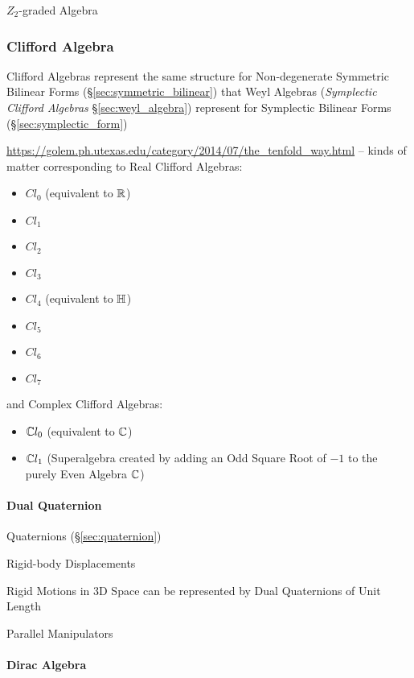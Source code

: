 {{$Z_2$-graded Algebra



\subsubsection{Clifford Algebra}\label{sec:clifford_algebra}

Clifford Algebras represent the same structure for Non-degenerate Symmetric
Bilinear Forms (\S\ref{sec:symmetric_bilinear}) that Weyl Algebras
(\emph{Symplectic Clifford Algebras} \S\ref{sec:weyl_algebra}) represent for
Symplectic Bilinear Forms (\S\ref{sec:symplectic_form})

\url{https://golem.ph.utexas.edu/category/2014/07/the_tenfold_way.html} -- kinds
of matter corresponding to Real Clifford Algebras:
\begin{itemize}
\item $Cl_0$ (equivalent to $\mathbb{R}$)
\item $Cl_1$
\item $Cl_2$
\item $Cl_3$
\item $Cl_4$ (equivalent to $\mathbb{H}$)
\item $Cl_5$
\item $Cl_6$
\item $Cl_7$
\end{itemize}
and Complex Clifford Algebras:
\begin{itemize}
\item $\mathbb{C}{l}_0$ (equivalent to $\mathbb{C}$)
\item $\mathbb{C}{l}_1$ (Superalgebra created by adding an Odd Square Root of $-1$
  to the purely Even Algebra $\mathbb{C}$)
\end{itemize}



\paragraph{Dual Quaternion}\label{sec:dual_quaternion}\hfill

\fist Quaternions (\S\ref{sec:quaternion})

Rigid-body Displacements

Rigid Motions in 3D Space can be represented by Dual Quaternions of Unit Length

Parallel Manipulators



\paragraph{Dirac Algebra}\label{sec:dirac_algebra}\hfill

}}
